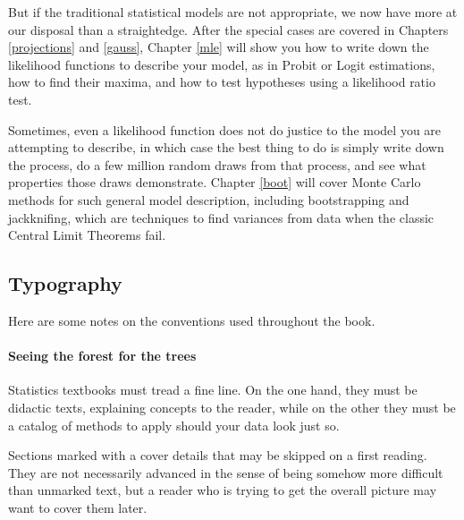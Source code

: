 But if the traditional statistical models are not appropriate, we now have
more at our disposal than a straightedge.
After the special cases are covered in Chapters \ref{projections}
and \ref{gauss}, Chapter \ref{mle} will show you how to write down the
likelihood functions to describe your model, as in Probit or Logit
estimations, how to find their maxima, and how to test hypotheses using
a likelihood ratio test.

Sometimes, even a likelihood function does not do justice to the model
you are attempting to describe, in which case the best thing to do is
simply write down the process, do a few million random draws from
that process, and see what properties those draws demonstrate.
Chapter \ref{boot} will cover Monte Carlo methods for such general
model description, including bootstrapping and jackknifing, which are
techniques to find variances from data when the classic Central Limit
Theorems fail.  

  

\subsection{Typography}
Here are some notes on the conventions used throughout the book.


\paragraph{\treesymbol Seeing the forest for the trees} Statistics textbooks
must tread a fine line. On the one hand, they must be didactic texts,
explaining concepts to the reader, while on the other they must be a
catalog of methods to apply should your data look just so.

Sections marked with a \ind{\treesymbol} cover details that may be
skipped on a first reading. They are not necessarily advanced
in the sense of being somehow more difficult than unmarked text, but a
reader who is trying to get the overall picture may want to cover them 
later. 

